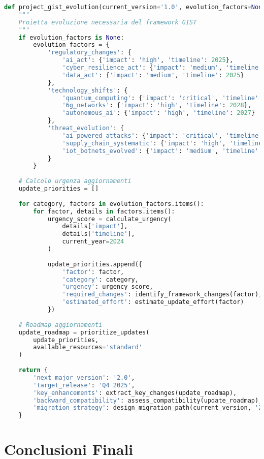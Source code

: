 \begin{lstlisting}[language=Python, caption=Proiezione evoluzione framework GIST]
def project_gist_evolution(current_version='1.0', evolution_factors=None):
    """
    Proietta evoluzione necessaria del framework GIST
    """
    if evolution_factors is None:
        evolution_factors = {
            'regulatory_changes': {
                'ai_act': {'impact': 'high', 'timeline': 2025},
                'cyber_resilience_act': {'impact': 'medium', 'timeline': 2024},
                'data_act': {'impact': 'medium', 'timeline': 2025}
            },
            'technology_shifts': {
                'quantum_computing': {'impact': 'critical', 'timeline': 2030},
                '6g_networks': {'impact': 'high', 'timeline': 2028},
                'autonomous_ai': {'impact': 'high', 'timeline': 2027}
            },
            'threat_evolution': {
                'ai_powered_attacks': {'impact': 'critical', 'timeline': 2024},
                'supply_chain_systematic': {'impact': 'high', 'timeline': 2025},
                'iot_botnets_evolved': {'impact': 'medium', 'timeline': 2024}
            }
        }
        
    # Calcolo urgenza aggiornamenti
    update_priorities = []
    
    for category, factors in evolution_factors.items():
        for factor, details in factors.items():
            urgency_score = calculate_urgency(
                details['impact'],
                details['timeline'],
                current_year=2024
            )
            
            update_priorities.append({
                'factor': factor,
                'category': category,
                'urgency': urgency_score,
                'required_changes': identify_framework_changes(factor),
                'estimated_effort': estimate_update_effort(factor)
            })
            
    # Roadmap aggiornamenti
    update_roadmap = prioritize_updates(
        update_priorities,
        available_resources='standard'
    )
    
    return {
        'next_major_version': '2.0',
        'target_release': 'Q4 2025',
        'key_enhancements': extract_key_changes(update_roadmap),
        'backward_compatibility': assess_compatibility(update_roadmap),
        'migration_strategy': design_migration_path(current_version, '2.0')
    }
\end{lstlisting}

\section{Conclusioni Finali}

